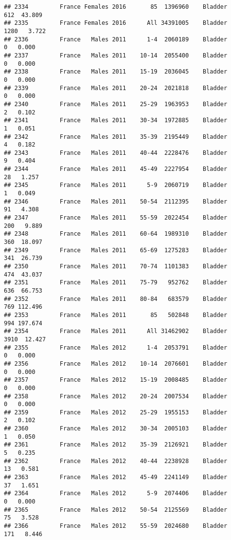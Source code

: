 \documentclass[
]{article}
\begin{document}
\begin{verbatim}
## 2334         France Females 2016       85  1396960    Bladder    612  43.809
## 2335         France Females 2016      All 34391005    Bladder   1280   3.722
## 2336         France   Males 2011      1-4  2060189    Bladder      0   0.000
## 2337         France   Males 2011    10-14  2055400    Bladder      0   0.000
## 2338         France   Males 2011    15-19  2036045    Bladder      0   0.000
## 2339         France   Males 2011    20-24  2021818    Bladder      0   0.000
## 2340         France   Males 2011    25-29  1963953    Bladder      2   0.102
## 2341         France   Males 2011    30-34  1972885    Bladder      1   0.051
## 2342         France   Males 2011    35-39  2195449    Bladder      4   0.182
## 2343         France   Males 2011    40-44  2228476    Bladder      9   0.404
## 2344         France   Males 2011    45-49  2227954    Bladder     28   1.257
## 2345         France   Males 2011      5-9  2060719    Bladder      1   0.049
## 2346         France   Males 2011    50-54  2112395    Bladder     91   4.308
## 2347         France   Males 2011    55-59  2022454    Bladder    200   9.889
## 2348         France   Males 2011    60-64  1989310    Bladder    360  18.097
## 2349         France   Males 2011    65-69  1275283    Bladder    341  26.739
## 2350         France   Males 2011    70-74  1101383    Bladder    474  43.037
## 2351         France   Males 2011    75-79   952762    Bladder    636  66.753
## 2352         France   Males 2011    80-84   683579    Bladder    769 112.496
## 2353         France   Males 2011       85   502848    Bladder    994 197.674
## 2354         France   Males 2011      All 31462902    Bladder   3910  12.427
## 2355         France   Males 2012      1-4  2053791    Bladder      0   0.000
## 2356         France   Males 2012    10-14  2076601    Bladder      0   0.000
## 2357         France   Males 2012    15-19  2008485    Bladder      0   0.000
## 2358         France   Males 2012    20-24  2007534    Bladder      0   0.000
## 2359         France   Males 2012    25-29  1955153    Bladder      2   0.102
## 2360         France   Males 2012    30-34  2005103    Bladder      1   0.050
## 2361         France   Males 2012    35-39  2126921    Bladder      5   0.235
## 2362         France   Males 2012    40-44  2238928    Bladder     13   0.581
## 2363         France   Males 2012    45-49  2241149    Bladder     37   1.651
## 2364         France   Males 2012      5-9  2074406    Bladder      0   0.000
## 2365         France   Males 2012    50-54  2125569    Bladder     75   3.528
## 2366         France   Males 2012    55-59  2024680    Bladder    171   8.446

\end{verbatim}
\end{document}
